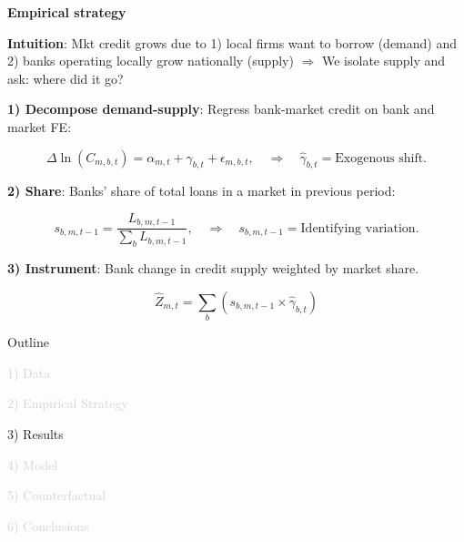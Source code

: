 \documentclass[aspectratio=169]{beamer}
\begin{document}
\begin{frame}{\textbf{Empirical strategy}} \label{iv_market_level}

\textbf{Intuition}: Mkt credit grows due to 1) local firms want to borrow (demand) and 2) banks operating locally grow nationally (supply) $\Rightarrow$ We isolate supply and ask: where did it go?

\vspace{5mm}
\pause

\textbf{1) Decompose demand-supply}: Regress bank-market credit on bank and market FE:

\begin{equation*}
    \Delta \ln(C_{m,b,t}) = \alpha_{m,t} + \gamma_{b,t} + \epsilon_{m,b,t}, \quad \Rightarrow \quad \hat{\gamma}_{b,t} = \text{Exogenous shift.} 
\end{equation*}
\pause

\textbf{2) Share}: Banks' share of total loans in a market in previous period:

\begin{equation*}
    s_{b,m,t-1} = \frac{L_{b,m,t-1}}{\sum_b L_{b,m,t-1}}, \quad \Rightarrow \quad s_{b,m,t-1} = \text{Identifying variation.} 
\end{equation*}
\pause

\textbf{3) Instrument}: Bank change in credit supply weighted by market share.  \hyperlink{iv_bank_level}{} \hyperlink{loo}{}

\begin{equation*}
    \hat{Z}_{m,t} = \sum_b \left( s_{b,m,t-1} \times \hat{\gamma}_{b,t} \right) 
\end{equation*}


\end{frame}


\begin{frame}[noframenumbering]{Outline}

\Large

\textcolor{lightgray}{1) Data}

\vspace{5mm}

\textcolor{lightgray}{2) Empirical Strategy}

\vspace{5mm}

3) Results

\vspace{5mm}

\textcolor{lightgray}{4) Model}

\vspace{5mm}

\textcolor{lightgray}{5) Counterfactual}

\vspace{5mm}

\textcolor{lightgray}{6) Conclusions}

\end{frame}
\end{document}
